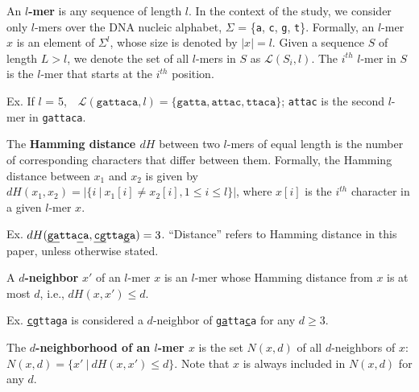 \documentclass[oneside,12pt]{DISCSthesis}
\begin{document}

		\noindent An \textbf{\boldmath $l$-mer} is any sequence of length $l$. In the context of the study, we consider only $l$-mers over the DNA nucleic alphabet, $\Sigma$ = \{\texttt{a}, \texttt{c}, \texttt{g}, \texttt{t}\}. Formally, an $l$-mer $x$ is an element of $\Sigma^l$, whose size is denoted by $|x| = l$. Given a sequence $S$ of length $L > l$, we denote the set of all $l$-mers in $S$ as $\mathcal{L}(S_i, l)$. The $i^{th}$ $l$-mer in $S$ is the $l$-mer that starts at the $i^{th}$ position.

		\noindent \hspace*{35pt} Ex. If $l$ = 5,\ \ $\mathcal{L}(\texttt{gattaca}, l)= \{\texttt{gatta},\texttt{attac},\texttt{ttaca}\}$;
		\newline\hspace*{55pt}	\texttt{attac} is the second $l$-mer in \texttt{gattaca}.\newline


		\noindent The \textbf{\boldmath Hamming distance $dH$} between two $l$-mers of equal length is the number of corresponding characters that differ between them. Formally, the Hamming distance between $x_1$ and $x_2$ is given by $ dH(x_1, x_2) = | \{i\ |\ x_1[i] \neq x_2[i], 1 \leq i \leq l\} |$, where $x[i]$ is the $i^{th}$ character in a given $l$-mer $x$.

		\noindent \hspace*{35pt} Ex. $dH(\texttt{\ul{ga}tta\ul{c}a}, \texttt{\ul{cg}tta\ul{g}a}) = 3$. \newline
		\noindent ``Distance'' refers to Hamming distance in this paper, unless otherwise stated.\newline

		
		\noindent A {\boldmath\bf $d$-neighbor} $x'$ of an $l$-mer $x$ is an $l$-mer whose Hamming distance from $x$ is at most $d$, i.e., {\boldmath $dH (x, x') \leq d$}.

		\noindent \hspace*{35pt} Ex. \texttt{\ul{cg}tta\ul{g}a} is considered a $d$-neighbor of \texttt{\ul{ga}tta\ul{c}a} for any $d \geq 3$.\newline

		\noindent The \textbf{\boldmath $d$-neighborhood of an $l$-mer $x$} is the set {\boldmath $N(x, d)$} of all $d$-neighbors of $x$: $N(x,d) = \{ x'\ |\ dH(x, x') \leq d\}$. Note that $x$ is always included in $N(x,d)$ for any $d$.\newline
		
\end{document}
